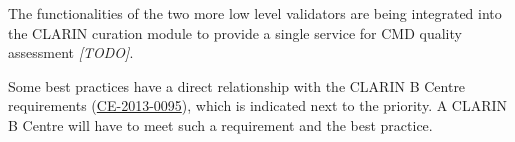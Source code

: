 The functionalities of the two more low level validators are being
integrated into the CLARIN curation module to provide a single service
for CMD quality assessment \emph{{[}TODO{]}}.

Some best practices have a direct relationship with the CLARIN B Centre
requirements (\href{http://hdl.handle.net/11372/DOC-78}{CE-2013-0095}),
which is indicated next to the priority. A CLARIN B Centre will have to
meet such a requirement and the best practice.
